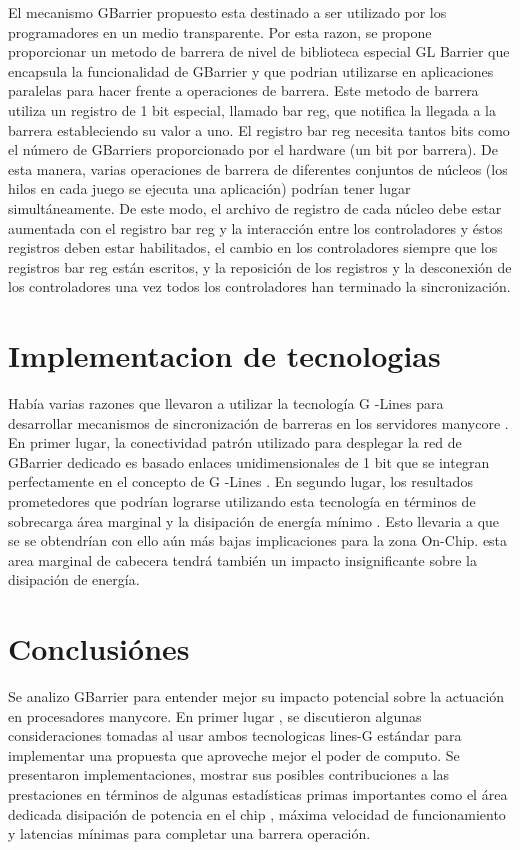 \documentclass[conference]{IEEEtran}
\begin{document}
El mecanismo GBarrier 
propuesto esta destinado a ser
 utilizado por los programadores en un medio transparente. 
 Por esta razon, se propone proporcionar un metodo de barrera de 
 nivel de biblioteca especial GL Barrier que encapsula 
 la funcionalidad de GBarrier y que podrian utilizarse
  en aplicaciones paralelas para hacer frente a operaciones de barrera.
   Este metodo de barrera utiliza un registro de
    1 bit especial, 
    llamado bar reg,
    que notifica la llegada a la barrera estableciendo su valor a uno. El registro bar reg necesita tantos bits como el número de GBarriers
proporcionado por el hardware (un bit por barrera). De esta manera, varias operaciones de barrera
de diferentes conjuntos de núcleos (los hilos en cada juego se ejecuta una aplicación)
podrían tener lugar simultáneamente. De este modo, el archivo de registro de cada núcleo debe estar
aumentada con el registro bar reg y la interacción entre los controladores y éstos
registros deben estar habilitados, el cambio en los controladores siempre que los registros bar reg
están escritos, y la reposición de los registros y la desconexión de los controladores una vez
todos los controladores han terminado la sincronización.
	
	\section{Implementacion de tecnologias}
	
Había varias razones que llevaron a utilizar la tecnología G -Lines para desarrollar
mecanismos de sincronización de barreras en los servidores manycore . En primer lugar, la conectividad
patrón utilizado para desplegar la red de GBarrier dedicado es
basado enlaces unidimensionales de 1 bit que se integran perfectamente en el concepto de
G -Lines . En segundo lugar, los resultados prometedores que podrían lograrse utilizando esta tecnología
en términos de sobrecarga área marginal y la disipación de energía mínimo . Esto llevaria a que se
se obtendrían con ello aún más bajas implicaciones para la zona On-Chip. esta area marginal
de cabecera tendrá también un impacto insignificante sobre la disipación de energía. 

	
	


	\section{Conclusiónes}

Se analizo GBarrier para entender mejor su impacto potencial sobre la
actuación en procesadores manycore. En primer lugar , se discutieron algunas consideraciones tomadas al usar
ambos tecnologicas lines-G estándar para implementar una propuesta que aproveche mejor el poder de computo. Se presentaron
implementaciones, mostrar sus posibles contribuciones a las prestaciones en términos de
algunas estadísticas primas importantes como el área dedicada disipación de potencia en el chip ,
máxima velocidad de funcionamiento y latencias mínimas para completar una barrera operación.
\end{document}
